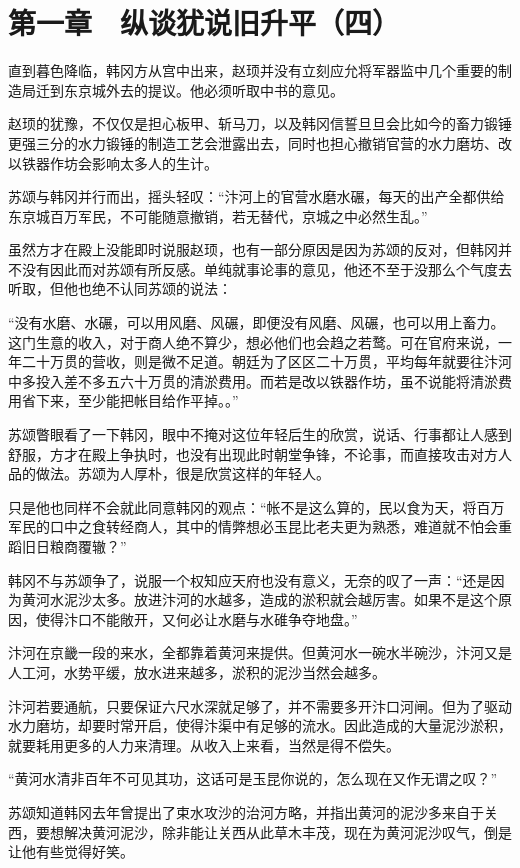 \section{第一章　纵谈犹说旧升平（四）}

直到暮色降临，韩冈方从宫中出来，赵顼并没有立刻应允将军器监中几个重要的制造局迁到东京城外去的提议。他必须听取中书的意见。

赵顼的犹豫，不仅仅是担心板甲、斩马刀，以及韩冈信誓旦旦会比如今的畜力锻锤更强三分的水力锻锤的制造工艺会泄露出去，同时也担心撤销官营的水力磨坊、改以铁器作坊会影响太多人的生计。

苏颂与韩冈并行而出，摇头轻叹：“汴河上的官营水磨水碾，每天的出产全都供给东京城百万军民，不可能随意撤销，若无替代，京城之中必然生乱。”

虽然方才在殿上没能即时说服赵顼，也有一部分原因是因为苏颂的反对，但韩冈并不没有因此而对苏颂有所反感。单纯就事论事的意见，他还不至于没那么个气度去听取，但他也绝不认同苏颂的说法：

“没有水磨、水碾，可以用风磨、风碾，即便没有风磨、风碾，也可以用上畜力。这门生意的收入，对于商人绝不算少，想必他们也会趋之若鹜。可在官府来说，一年二十万贯的营收，则是微不足道。朝廷为了区区二十万贯，平均每年就要往汴河中多投入差不多五六十万贯的清淤费用。而若是改以铁器作坊，虽不说能将清淤费用省下来，至少能把帐目给作平掉。。”

苏颂瞥眼看了一下韩冈，眼中不掩对这位年轻后生的欣赏，说话、行事都让人感到舒服，方才在殿上争执时，也没有出现此时朝堂争锋，不论事，而直接攻击对方人品的做法。苏颂为人厚朴，很是欣赏这样的年轻人。

只是他也同样不会就此同意韩冈的观点：“帐不是这么算的，民以食为天，将百万军民的口中之食转经商人，其中的情弊想必玉昆比老夫更为熟悉，难道就不怕会重蹈旧日粮商覆辙？”

韩冈不与苏颂争了，说服一个权知应天府也没有意义，无奈的叹了一声：“还是因为黄河水泥沙太多。放进汴河的水越多，造成的淤积就会越厉害。如果不是这个原因，使得汴口不能敞开，又何必让水磨与水碓争夺地盘。”

汴河在京畿一段的来水，全都靠着黄河来提供。但黄河水一碗水半碗沙，汴河又是人工河，水势平缓，放水进来越多，淤积的泥沙当然会越多。

汴河若要通航，只要保证六尺水深就足够了，并不需要多开汴口河闸。但为了驱动水力磨坊，却要时常开启，使得汴渠中有足够的流水。因此造成的大量泥沙淤积，就要耗用更多的人力来清理。从收入上来看，当然是得不偿失。

“黄河水清非百年不可见其功，这话可是玉昆你说的，怎么现在又作无谓之叹？”

苏颂知道韩冈去年曾提出了束水攻沙的治河方略，并指出黄河的泥沙多来自于关西，要想解决黄河泥沙，除非能让关西从此草木丰茂，现在为黄河泥沙叹气，倒是让他有些觉得好笑。

